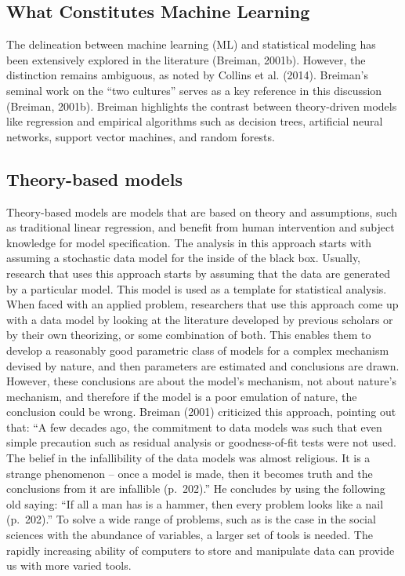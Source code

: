 \documentclass[
  man]{apa7}
\begin{document}
\hypertarget{what-constitutes-machine-learning}{%
\subsection{What Constitutes Machine Learning}\label{what-constitutes-machine-learning}}

The delineation between machine learning (ML) and statistical modeling has been extensively explored in the literature (Breiman, 2001b).
However, the distinction remains ambiguous, as noted by Collins et al. (2014).
Breiman's seminal work on the ``two cultures'' serves as a key reference in this discussion (Breiman, 2001b).
Breiman highlights the contrast between theory-driven models like regression and empirical algorithms such as decision trees, artificial neural networks, support vector machines, and random forests.

\hypertarget{theory-based-models}{%
\subsection{Theory-based models}\label{theory-based-models}}

Theory-based models are models that are based on theory and assumptions, such as traditional linear regression, and benefit from human intervention and subject knowledge for model specification.
The analysis in this approach starts with assuming a stochastic data model for the inside of the black box.
Usually, research that uses this approach starts by assuming that the data are generated by a particular model.
This model is used as a template for statistical analysis.
When faced with an applied problem, researchers that use this approach come up with a data model by looking at the literature developed by previous scholars or by their own theorizing, or some combination of both.
This enables them to develop a reasonably good parametric class of models for a complex mechanism devised by nature, and then parameters are estimated and conclusions are drawn.
However, these conclusions are about the model's mechanism, not about nature's mechanism, and therefore if the model is a poor emulation of nature, the conclusion could be wrong.
Breiman (2001) criticized this approach, pointing out that: ``A few decades ago, the commitment to data models was such that even simple precaution such as residual analysis or goodness-of-fit tests were not used. The belief in the infallibility of the data models was almost religious. It is a strange phenomenon -- once a model is made, then it becomes truth and the conclusions from it are infallible (p.~202).'' He concludes by using the following old saying: ``If all a man has is a hammer, then every problem looks like a nail (p.~202).'' To solve a wide range of problems, such as is the case in the social sciences with the abundance of variables, a larger set of tools is needed.
The rapidly increasing ability of computers to store and manipulate data can provide us with more varied tools.
\end{document}
